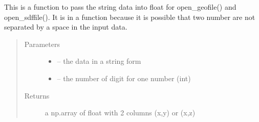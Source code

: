 \documentclass[letterpaper,10pt,english]{sphinxmanual}
\begin{document}

\begin{fulllineitems}
\label{\detokenize{index:src.Hec_ras06.pass_in_float_from_geo}}
This is a function to pass the string data into float for open\_geofile() and open\_sdffile(). It is in a function
because it is possible that two number are not separated by a space in the input data.
\begin{quote}\begin{description}
\item[{Parameters}] \leavevmode\begin{itemize}
\item {} 
 -- the data in a string form

\item {} 
 -- the number of digit for one number (int)

\end{itemize}

\item[{Returns}] \leavevmode
a np.array of float with 2 columns  (x,y) or (x,z)

\end{description}\end{quote}

\end{fulllineitems}

\end{document}
